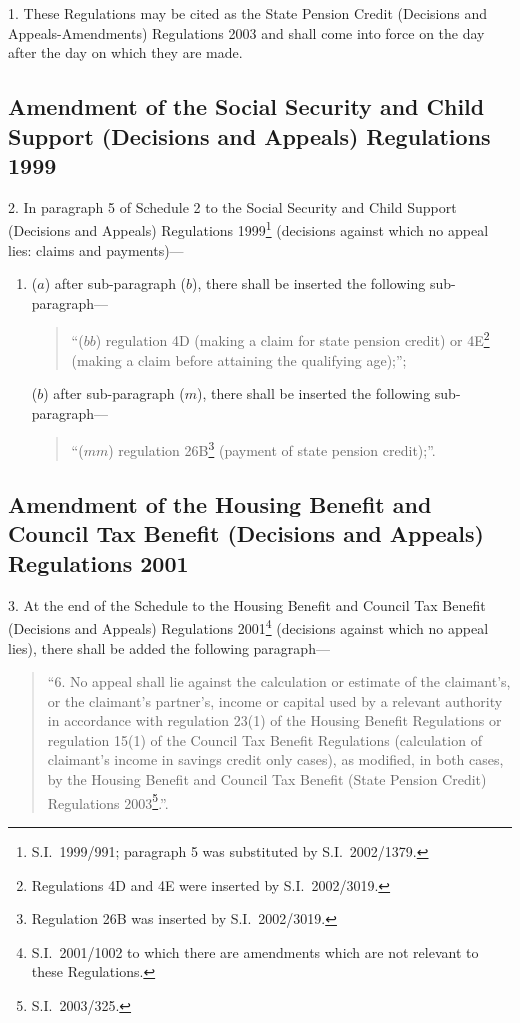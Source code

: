 \documentclass[12pt,a4paper]{article}
\begin{document}
1.  These Regulations may be cited as the State Pension Credit (Decisions and Appeals-Amendments) Regulations 2003 and shall come into force on the day after the day on which they are made.

\subsection[2. Amendment of the Social Security and Child Support (Decisions and Appeals) Regulations 1999]{Amendment of the Social Security and Child Support (Decisions and Appeals) Regulations 1999}

2.  In paragraph 5 of Schedule 2 to the Social Security and Child Support (Decisions and Appeals) Regulations 1999\footnote{S.I.\ 1999/991; paragraph 5 was substituted by S.I.\ 2002/1379.} (decisions against which no appeal lies: claims and payments)—
\begin{enumerate}\item[]
($a$) after sub-paragraph ($b$), there shall be inserted the following sub-paragraph—
\begin{quotation}
“($bb$) regulation 4D (making a claim for state pension credit) or 4E\footnote{Regulations 4D and 4E were inserted by S.I.\ 2002/3019.} (making a claim before attaining the qualifying age);”;
\end{quotation}

($b$) after sub-paragraph ($m$), there shall be inserted the following sub-paragraph—
\begin{quotation}
“($mm$) regulation 26B\footnote{Regulation 26B was inserted by S.I.\ 2002/3019.} (payment of state pension credit);”.
\end{quotation}
\end{enumerate}

\subsection[3. Amendment of the Housing Benefit and Council Tax Benefit (Decisions and Appeals) Regulations 2001]{Amendment of the Housing Benefit and Council Tax Benefit (Decisions and Appeals) Regulations 2001}

3.  At the end of the Schedule to the Housing Benefit and Council Tax Benefit (Decisions and Appeals) Regulations 2001\footnote{S.I.\ 2001/1002 to which there are amendments which are not relevant to these Regulations.} (decisions against which no appeal lies), there shall be added the following paragraph—
\begin{quotation}
“6.  No appeal shall lie against the calculation or estimate of the claimant's, or the claimant’s partner's, income or capital used by a relevant authority in accordance with regulation 23(1) of the Housing Benefit Regulations or regulation 15(1) of the Council Tax Benefit Regulations (calculation of claimant’s income in savings credit only cases), as modified, in both cases, by the Housing Benefit and Council Tax Benefit (State Pension Credit) Regulations 2003\footnote{S.I.\ 2003/325.}.”.
\end{quotation}
\end{document}
